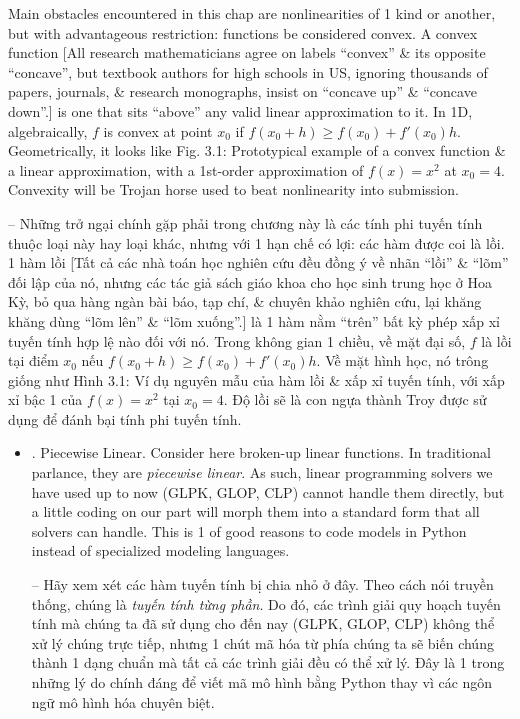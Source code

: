 \documentclass{article}
\begin{document}
\begin{itemize}
    Main obstacles encountered in this chap are nonlinearities of 1 kind or another, but with advantageous restriction: functions be considered convex. A convex function [All research mathematicians agree on labels ``convex'' \& its opposite ``concave'', but textbook authors for high schools in US, ignoring thousands of papers, journals, \& research monographs, insist on ``concave up'' \& ``concave down''.] is one that sits ``above'' any valid linear approximation to it. In 1D, algebraically, $f$ is convex at point $x_0$ if $f(x_0 + h)\ge f(x_0) + f'(x_0)h$. Geometrically, it looks like {\sf Fig. 3.1: Prototypical example of a convex function \& a linear approximation}, with a 1st-order approximation of $f(x) = x^2$ at $x_0 = 4$. Convexity will be Trojan horse used to beat nonlinearity into submission.

    -- Những trở ngại chính gặp phải trong chương này là các tính phi tuyến tính thuộc loại này hay loại khác, nhưng với 1 hạn chế có lợi: các hàm được coi là lồi. 1 hàm lồi [Tất cả các nhà toán học nghiên cứu đều đồng ý về nhãn ``lồi'' \& ``lõm'' đối lập của nó, nhưng các tác giả sách giáo khoa cho học sinh trung học ở Hoa Kỳ, bỏ qua hàng ngàn bài báo, tạp chí, \& chuyên khảo nghiên cứu, lại khăng khăng dùng ``lõm lên'' \& ``lõm xuống''.] là 1 hàm nằm ``trên'' bất kỳ phép xấp xỉ tuyến tính hợp lệ nào đối với nó. Trong không gian 1 chiều, về mặt đại số, $f$ là lồi tại điểm $x_0$ nếu $f(x_0 + h)\ge f(x_0) + f'(x_0)h$. Về mặt hình học, nó trông giống như {\sf Hình 3.1: Ví dụ nguyên mẫu của hàm lồi \& xấp xỉ tuyến tính}, với xấp xỉ bậc 1 của $f(x) = x^2$ tại $x_0 = 4$. Độ lồi sẽ là con ngựa thành Troy được sử dụng để đánh bại tính phi tuyến tính.
    \begin{itemize}
        \item {. Piecewise Linear.} Consider here broken-up linear functions. In traditional parlance, they are {\it piecewise linear}. As such, linear programming solvers we have used up to now (GLPK, GLOP, CLP) cannot handle them directly, but a little coding on our part will morph them into a standard form that all solvers can handle. This is 1 of good reasons to code models in Python instead of specialized modeling languages.

        -- Hãy xem xét các hàm tuyến tính bị chia nhỏ ở đây. Theo cách nói truyền thống, chúng là {\it tuyến tính từng phần}. Do đó, các trình giải quy hoạch tuyến tính mà chúng ta đã sử dụng cho đến nay (GLPK, GLOP, CLP) không thể xử lý chúng trực tiếp, nhưng 1 chút mã hóa từ phía chúng ta sẽ biến chúng thành 1 dạng chuẩn mà tất cả các trình giải đều có thể xử lý. Đây là 1 trong những lý do chính đáng để viết mã mô hình bằng Python thay vì các ngôn ngữ mô hình hóa chuyên biệt.


\end{itemize}
\end{itemize}
\end{document}
